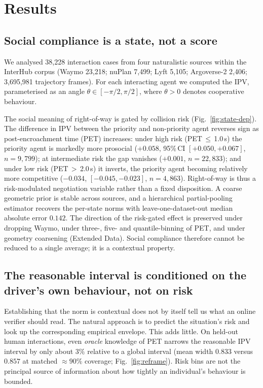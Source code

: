 \documentclass[12pt,a4paper]{article}
\begin{document}
\section{Results}

\subsection{Social compliance is a state, not a score}
We analysed 38{,}228 interaction cases from four naturalistic sources within the InterHub
corpus (Waymo 23{,}218; nuPlan 7{,}499; Lyft 5{,}105; Argoverse-2 2{,}406; 3{,}695{,}981
trajectory frames). For each interacting agent we computed the IPV, parameterised as an
angle $\theta\in[-\pi/2,\pi/2]$, where $\theta>0$ denotes cooperative behaviour.

The social meaning of right-of-way is gated by collision risk (Fig.~\ref{fig:state-dep}).
The difference in IPV between the priority and non-priority agent reverses sign as
post-encroachment time (PET) increases: under high risk (PET\,$\le$\,1.0\,s) the priority
agent is markedly more prosocial ($+0.058$, 95\%\,CI $[+0.050,+0.067]$, $n=9{,}799$); at
intermediate risk the gap vanishes ($+0.001$, $n=22{,}833$); and under low risk
(PET\,$>$\,2.0\,s) it inverts, the priority agent becoming relatively more competitive
($-0.034$, $[-0.045,-0.023]$, $n=4{,}863$). Right-of-way is thus a risk-modulated
negotiation variable rather than a fixed disposition. A coarse geometric prior is stable
across sources, and a hierarchical partial-pooling estimator recovers the per-state norms
with leave-one-dataset-out median absolute error $0.142$. The direction of the risk-gated
effect is preserved under dropping Waymo, under three-, five- and quantile-binning of PET,
and under geometry coarsening (Extended Data). Social compliance therefore cannot be reduced
to a single average; it is a contextual property.

\subsection{The reasonable interval is conditioned on the driver's own behaviour, not on risk}
Establishing that the norm is contextual does not by itself tell us what an online verifier
should read. The natural approach is to predict the situation's risk and look up the
corresponding empirical envelope. This adds little. On held-out human interactions, even
\emph{oracle} knowledge of PET narrows the reasonable IPV interval by only about $3\%$
relative to a global interval (mean width $0.833$ versus $0.857$ at matched $\approx$$90\%$
coverage; Fig.~\ref{fig:reframe}). Risk bins are not the principal source of information
about how tightly an individual's behaviour is bounded.
\end{document}
